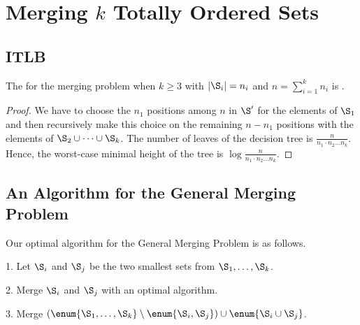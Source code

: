 \section{Merging $k$ Totally Ordered Sets}
\label{tree:merging:kgeq3}


\subsection*{ITLB}
\label{tree:merging:kgeq3:ITLB}


\begin{theorem}
The  for the merging problem when $k \geq 3$ with $|\S_i| = n_i$ and $n =
\sum_{i=1}^{k} n_i$ is .
\end{theorem}

\begin{proof}
We have to choose the $n_1$ positions among $n$ in $\S'$ for the elements of
$\S_1$ and then recursively make this choice on the remaining $n - n_1$
positions with the elements of \(\S_2 \cup \dots \cup \S_k\). The number of
leaves of the decision tree is $\frac{n}{n_1 \cdot n_2 \dots n_k}$. Hence, the
worst-case minimal height of the tree is $\log \frac{n}{n_1 \cdot n_2 \dots
n_k}$.
\end{proof}


\subsection*{An Algorithm for the General Merging Problem}
\label{tree:merging:kgeq3:alg}

Our optimal algorithm for the General Merging Problem is as follows.

\begin{algorithm}
\item[1.] Let \(\S_i\) and \(\S_j\) be the two smallest sets from \(\S_1 ,
\dots , \S_k\).
\item[2.] Merge \(\S_i\) and \(\S_j\) with an optimal algorithm.
\item[3.] Merge \((\enum{\S_1 , \dots , \S_k} \setminus \enum{\S_i,\S_j} )
\cup \enum{\S_i \cup \S_j}\).
\end{algorithm}

